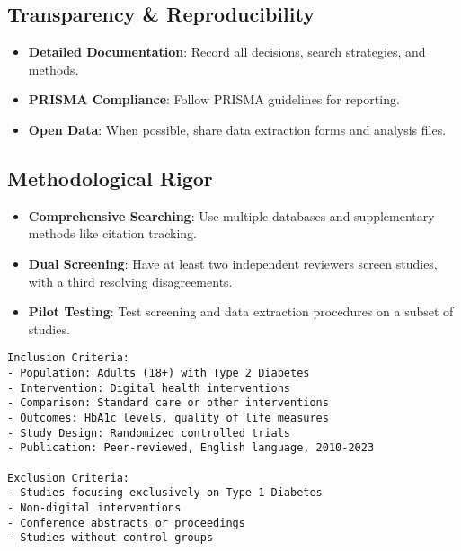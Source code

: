 \subsection{Transparency \& Reproducibility}

\begin{itemize}
    \item \textbf{Detailed Documentation}: Record all decisions, search strategies, and methods.
    \item \textbf{PRISMA Compliance}: Follow PRISMA guidelines for reporting.
    \item \textbf{Open Data}: When possible, share data extraction forms and analysis files.
\end{itemize}


\subsection{Methodological Rigor}

\begin{itemize}
    \item \textbf{Comprehensive Searching}: Use multiple databases and supplementary methods like citation tracking.
    \item \textbf{Dual Screening}: Have at least two independent reviewers screen studies, with a third resolving disagreements.
    \item \textbf{Pilot Testing}: Test screening and data extraction procedures on a subset of studies.
\end{itemize}


\begin{configbox}
\begin{lstlisting}
Inclusion Criteria:
- Population: Adults (18+) with Type 2 Diabetes
- Intervention: Digital health interventions
- Comparison: Standard care or other interventions
- Outcomes: HbA1c levels, quality of life measures
- Study Design: Randomized controlled trials
- Publication: Peer-reviewed, English language, 2010-2023

Exclusion Criteria:
- Studies focusing exclusively on Type 1 Diabetes
- Non-digital interventions
- Conference abstracts or proceedings
- Studies without control groups
\end{lstlisting}
\end{configbox}

